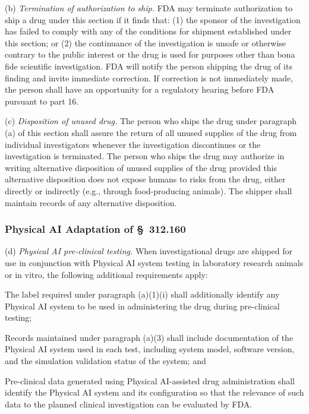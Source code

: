 \documentclass[11pt]{article}
\begin{document}
(b) \textit{Termination of authorization to ship.} FDA may terminate authorization to ship a drug under this section if it finds that: (1) the sponsor of the investigation has failed to comply with any of the conditions for shipment established under this section; or (2) the continuance of the investigation is unsafe or otherwise contrary to the public interest or the drug is used for purposes other than bona fide scientific investigation. FDA will notify the person shipping the drug of its finding and invite immediate correction. If correction is not immediately made, the person shall have an opportunity for a regulatory hearing before FDA pursuant to part 16.

(c) \textit{Disposition of unused drug.} The person who ships the drug under paragraph (a) of this section shall assure the return of all unused supplies of the drug from individual investigators whenever the investigation discontinues or the investigation is terminated. The person who ships the drug may authorize in writing alternative disposition of unused supplies of the drug provided this alternative disposition does not expose humans to risks from the drug, either directly or indirectly (e.g., through food-producing animals). The shipper shall maintain records of any alternative disposition.

\subsubsection{Physical AI Adaptation of \S~312.160}

(d) \textit{Physical AI pre-clinical testing.} When investigational drugs are shipped for use in conjunction with Physical AI system testing in laboratory research animals or in vitro, the following additional requirements apply:

\begin{description}[leftmargin=0.8cm,style=sameline]
\item[(i)] The label required under paragraph (a)(1)(i) shall additionally identify any Physical AI system to be used in administering the drug during pre-clinical testing;
\item[(ii)] Records maintained under paragraph (a)(3) shall include documentation of the Physical AI system used in each test, including system model, software version, and the simulation validation status of the system; and
\item[(iii)] Pre-clinical data generated using Physical AI-assisted drug administration shall identify the Physical AI system and its configuration so that the relevance of such data to the planned clinical investigation can be evaluated by FDA.
\end{description}
\end{document}

